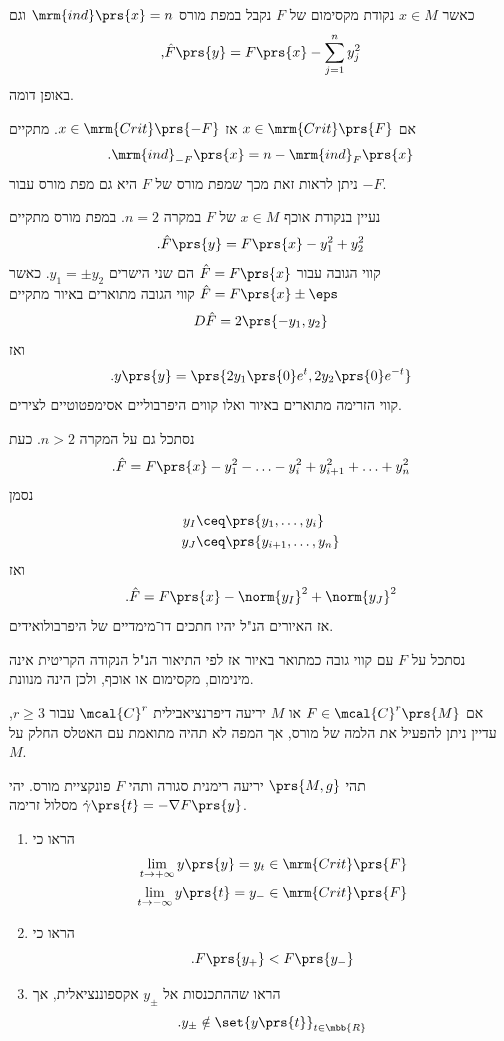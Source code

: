 \documentclass[a4paper,10pt,twoside,openany]{book}
\begin{document}
\begin{example}
כאשר
$x \in M$
נקודת מקסימום של
$F$
נקבל במפת מורס
$\mrm{ind}\prs{x} = n$
וגם
\[\text{,} \hat{F}\prs{y} = F\prs{x} - \sum_{j = 1}^n y_j^2\]
באופן דומה.
\end{example}

\begin{remark}
אם
$x \in \mrm{Crit}\prs{F}$
אז
$x \in \mrm{Crit}\prs{-F}$.
מתקיים
\[\text{.} \mrm{ind}_{-F}\prs{x} = n - \mrm{ind}_F\prs{x}\]
ניתן לראות זאת מכך שמפת מורס של
$F$
היא גם מפת מורס עבור
$-F$.
\end{remark}

\begin{example}
נעיין בנקודת אוכף
$x \in M$
של
$F$
במקרה
$n = 2$.
במפת מורס מתקיים
\[\text{.} \hat{F}\prs{y} = F\prs{x} - y_1^2 + y_2^2\]
קווי הגובה עבור
$\hat{F} = F\prs{x}$
הם שני הישרים
$y_1 = \pm y_2$.
כאשר
$\hat{F} = F\prs{x} \pm \eps$
קווי הגובה מתוארים באיור
מתקיים
\[D \hat{F} = 2 \prs{-y_1, y_2}\]
ואז
\[\text{.} y\prs{y} = \prs{2y_1\prs{0} e^t, 2 y_2\prs{0} e^{-t}}\]
קווי הזרימה מתוארים באיור
ואלו קווים היפרבוליים אסימפטוטיים לצירים.

נסתכל גם על המקרה
$n > 2$.
כעת
\[\text{.} \hat{F} = F\prs{x} - y_1^2 - \ldots - y_i^2 + y_{i+1}^2 + \ldots + y_n^2\]
נסמן
\begin{align*}
y_I &\ceq \prs{y_1, \ldots, y_i} \\
y_J &\ceq \prs{y_{i+1}, \ldots, y_n}
\end{align*}
ואז
\[\text{.} \hat{F} = F\prs{x} - \norm{y_I}^2 + \norm{y_J}^2\]
אז האיורים הנ"ל יהיו חתכים דו־מימדיים של היפרבולואידים.
\end{example}

\begin{example}
נסתכל על
$F$
עם קווי גובה כמתואר באיור
אז לפי התיאור הנ"ל הנקודה הקריטית אינה מינימום, מקסימום או אוכף, ולכן הינה מנוונת.
\end{example}

\begin{remark}
אם
$F \in \mcal{C}^r\prs{M}$
או
$M$
יריעה דיפרנציאבילית
$\mcal{C}^r$
עבור
$r \geq 3$,
עדיין ניתן להפעיל את הלמה של מורס, אך המפה לא תהיה מתואמת עם האטלס החלק על
$M$.
\end{remark}

\begin{exercise}
תהי
$\prs{M,g}$
יריעה רימנית סגורה ותהי
$F$
פונקציית מורס.
יהי
$\dot{\gamma}\prs{t} = - \nabla F\prs{y}$
מסלול זרימה.

\begin{enumerate}
\item
הראו כי
\begin{align*}
\lim_{t \to +\infty} y\prs{y} = y_t \in \mrm{Crit}\prs{F} \\
\lim_{t \to -\infty} y\prs{t} = y_- \in \mrm{Crit}\prs{F}
\end{align*}
\item
הראו כי
\[\text{.} F\prs{y_+} < F\prs{y_-}\]
\item הראו שההתכנסות אל
$y_\pm$
אקספוננציאלית, אך
\[\text{.} y_\pm \notin \set{y\prs{t}}_{t \in \mbb{R}}\]
\end{enumerate}
\end{exercise}
\end{document}
